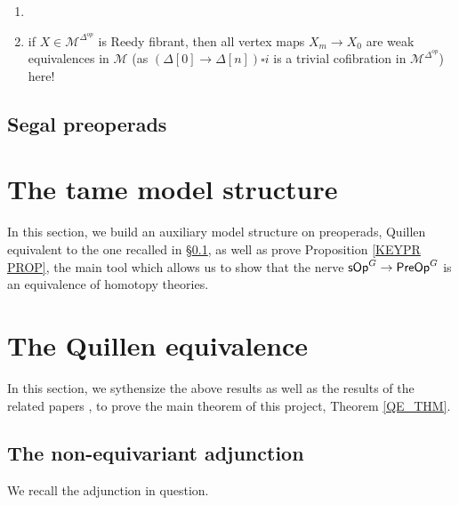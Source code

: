 \documentclass[a4paper,10pt
,draft
]{article}%
\renewcommand{\1}{\eta}%
\begin{document}
\begin{enumerate}
\item \item if $X \in \mathcal M^{\Delta^{op}}$ is Reedy fibrant, then all vertex maps $X_m \to X_0$ are weak equivalences in $\mathcal M$
      (as $(\Delta[0] \to \Delta[n]) \square i$ is a trivial cofibration in $\mathcal M^{\Delta^{op}}$)
      here!
\end{enumerate}


\subsection{Segal preoperads}
\label{SPREOP_SEC}


\section{The tame model structure}
\label{TAME_SEC}

In this section, we build an auxiliary model structure on preoperads, Quillen equivalent to the one recalled in \S \ref{SPREOP_SEC},
as well as prove Proposition \ref{KEYPR PROP},
the main tool which allows us to show that the nerve $\mathsf{sOp}^G \to \mathsf{PreOp}^G$ is an equivalence of homotopy theories.




\newpage

\section{The Quillen equivalence}

In this section, we sythensize the above results as well as the results of the related papers \cite{BP_geo,BP_edss,Per_eds},
to prove the main theorem of this project, Theorem \ref{QE_THM}.

\subsection{The non-equivariant adjunction}
We recall the adjunction in question.
\end{document}
